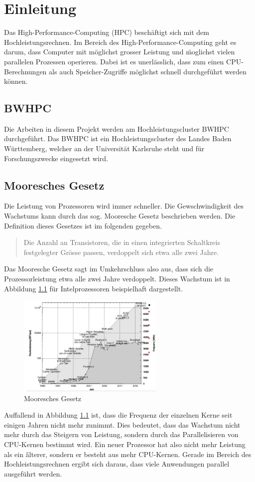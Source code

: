 \chapter{Einleitung}
\label{sec:einl}
Das High-Performance-Computing (HPC) besch\"aftigt sich mit dem Hochleistungsrechnen. Im Bereich des High-Performance-Computing geht es darum, dass Computer mit m\"oglichst grosser Leistung und \"moglichst vielen parallelen Prozessen operieren. Dabei ist es unerl\"asslich, dass zum einen CPU-Berechnungen als auch Speicher-Zugriffe m\"oglichst schnell durchgef\"uhrt werden k\"onnen.
\section{BWHPC}
Die Arbeiten in diesem Projekt werden am Hochleistungscluster BWHPC durchgef\"uhrt. Das BWHPC ist ein Hochleistungscluster des Landes Baden W\"urttemberg, welcher an der Universit\"at Karlsruhe steht und f\"ur Forschungszwecke eingesetzt wird.
\section{Mooresches Gesetz}
Die Leistung von Prozessoren wird immer schneller. Die Gewschwindigkeit des Wachstums kann durch das sog. Mooresche Gesetz beschrieben werden. Die Definition dieses Gesetzes ist im folgenden gegeben.

\begin{quote}Die Anzahl an Transistoren, die in einen integrierten Schaltkreis festgelegter Gr\"osse passen, verdoppelt sich etwa alle zwei Jahre.~\cite{Schanze.25.02.2016}\end{quote}
Das Mooresche Gesetz sagt im Umkehrschluss also aus, dass sich die Prozessorleistung etwa alle zwei Jahre verdoppelt. Dieses Wachstum ist in Abbildung \ref{fig:moore} f\"ur Intelprozessoren beispielhaft dargestellt.

\begin{figure}[h]
	\centering
	\includegraphics[width=7cm]{fig/Moore.jpg}
	\caption{Mooresches Gesetz}
	\label{fig:moore}
\end{figure}
Auffallend in Abbildung \ref{fig:moore} ist, dass die Frequenz der einzelnen Kerne seit einigen Jahren nicht mehr zunimmt. Dies bedeutet, dass das Wachstum nicht mehr durch das Steigern von Leistung, sondern durch das Parallelisieren von CPU-Kernen bestimmt wird. Ein neuer Prozessor hat also nicht mehr Leistung als ein \"älterer, sondern er besteht aus mehr CPU-Kernen. Gerade im Bereich des Hochleistungsrechnen ergibt sich daraus, dass viele Anwendungen parallel ausgef\"uhrt werden.
